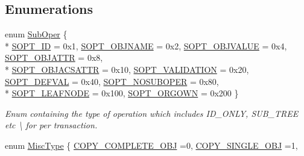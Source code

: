 \subsection*{Enumerations}
\begin{DoxyCompactItemize}
\item 
enum \hyperlink{group__LIBHELP_ga26a2d765c9669d7cf62818f31a306f76}{Sub\-Oper} \{ \\*
\hyperlink{group__LIBHELP_gga26a2d765c9669d7cf62818f31a306f76a86ca54869a37d6b2ee9f1ef03f18d7bd}{S\-O\-P\-T\-\_\-\-I\-D} = 0x1, 
\hyperlink{group__LIBHELP_gga26a2d765c9669d7cf62818f31a306f76a590689005d14f4443e685b735a0fb598}{S\-O\-P\-T\-\_\-\-O\-B\-J\-N\-A\-M\-E} = 0x2, 
\hyperlink{group__LIBHELP_gga26a2d765c9669d7cf62818f31a306f76a509d34676cdc189cd6db36c8f31df9c0}{S\-O\-P\-T\-\_\-\-O\-B\-J\-V\-A\-L\-U\-E} = 0x4, 
\hyperlink{group__LIBHELP_gga26a2d765c9669d7cf62818f31a306f76a08d5b1a74d6081b7c8fcf583dab97752}{S\-O\-P\-T\-\_\-\-O\-B\-J\-A\-T\-T\-R} = 0x8, 
\\*
\hyperlink{group__LIBHELP_gga26a2d765c9669d7cf62818f31a306f76a9830de59cb01d6e64813002b2dffe92c}{S\-O\-P\-T\-\_\-\-O\-B\-J\-A\-C\-S\-A\-T\-T\-R} = 0x10, 
\hyperlink{group__LIBHELP_gga26a2d765c9669d7cf62818f31a306f76abf85e6bbd86f9dff9fafb8b704f94dee}{S\-O\-P\-T\-\_\-\-V\-A\-L\-I\-D\-A\-T\-I\-O\-N} = 0x20, 
\hyperlink{group__LIBHELP_gga26a2d765c9669d7cf62818f31a306f76a43d345af96a636bddcae661c50020347}{S\-O\-P\-T\-\_\-\-D\-E\-F\-V\-A\-L} = 0x40, 
\hyperlink{group__LIBHELP_gga26a2d765c9669d7cf62818f31a306f76ad8a3297ca7cf6f201aeebbe7a1786d44}{S\-O\-P\-T\-\_\-\-N\-O\-S\-U\-B\-O\-P\-E\-R} = 0x80, 
\\*
\hyperlink{group__LIBHELP_gga26a2d765c9669d7cf62818f31a306f76a34f27eaeec6a02cf39bc5f9ccd625e84}{S\-O\-P\-T\-\_\-\-L\-E\-A\-F\-N\-O\-D\-E} = 0x100, 
\hyperlink{group__LIBHELP_gga26a2d765c9669d7cf62818f31a306f76a611b573ef4cad192232654b47c4e1ea0}{S\-O\-P\-T\-\_\-\-O\-R\-G\-O\-W\-N} = 0x200
 \}
\begin{DoxyCompactList}\small\item\em Enum containing the type of operation which includes I\-D\-\_\-\-O\-N\-L\-Y, S\-U\-B\-\_\-\-T\-R\-E\-E etc \textbackslash{} for per transaction. \end{DoxyCompactList}\item 
enum \hyperlink{group__LIBHELP_ga555fa67cbcfe777fe604bb5806ecab91}{Misc\-Type} \{ \hyperlink{group__LIBHELP_gga555fa67cbcfe777fe604bb5806ecab91a7f462f0d64035391542c63c66d0a700f}{C\-O\-P\-Y\-\_\-\-C\-O\-M\-P\-L\-E\-T\-E\-\_\-\-O\-B\-J} =0, 
\hyperlink{group__LIBHELP_gga555fa67cbcfe777fe604bb5806ecab91a96f2154f53b9b374ac0548088d938b96}{C\-O\-P\-Y\-\_\-\-S\-I\-N\-G\-L\-E\-\_\-\-O\-B\-J} =1, 

\end{DoxyCompactItemize}
